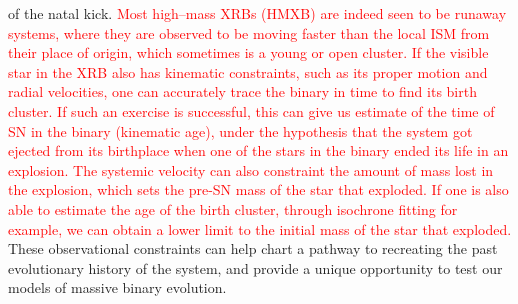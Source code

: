 \documentclass[linenumbers,trackchanges,twocolumn]{aastex701}
\newcommand{\red}{\textcolor{red}}
\begin{document}
of the natal kick. \red{Most high--mass XRBs (HMXB) are indeed seen to be runaway systems, where they are observed to be moving faster than the local ISM from their place of origin, which sometimes is a young or open cluster. If the visible star in the XRB also has kinematic constraints, such as its proper motion and radial velocities, one can accurately trace the binary in time to find its birth cluster. If such an exercise is successful, this can give us estimate of the time of SN in the binary (kinematic age), under the hypothesis that the system got ejected from its birthplace when one of the stars in the binary ended its life in an explosion. The systemic velocity can also constraint the amount of mass lost in the explosion, which sets the pre-SN mass of the star that exploded. If one is also able to estimate the age of the birth cluster, through isochrone fitting for example, we can obtain a lower limit to the initial mass of the star that exploded.} These observational constraints can help chart a pathway to recreating the past evolutionary history of the system, and provide a unique opportunity to test our models of massive binary evolution.  
\end{document}
